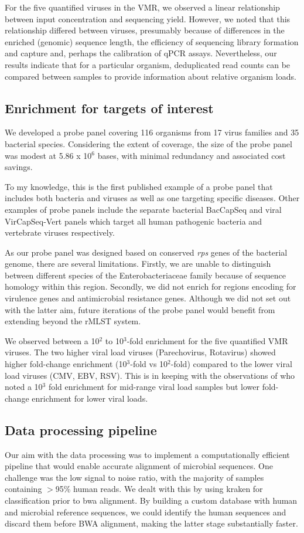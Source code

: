 For the five quantified viruses in the VMR, we observed a linear relationship between input concentration and sequencing yield. However, we noted that this relationship differed between viruses, presumably because of differences in the enriched (genomic) sequence length, the efficiency of sequencing library formation and capture and, perhaps the calibration of qPCR assays. Nevertheless, our results indicate that for a particular organism, deduplicated read counts can be compared between samples to provide information about relative organism loads. 

\subsection{Enrichment for targets of interest}
We developed a probe panel covering 116 organisms from 17 virus families and 35 bacterial species. Considering the extent of coverage, the size of the probe panel was modest at 5.86 x 10$^6$ bases, with minimal redundancy and associated cost savings. 

To my knowledge, this is the first published example of a probe panel that includes both bacteria and viruses as well as one targeting specific diseases. Other examples of probe panels include the separate bacterial BacCapSeq \parencite{Allicock2018} and viral VirCapSeq-Vert \parencite{Briese2015} panels which target all human pathogenic bacteria and vertebrate viruses respectively. 

As our probe panel was designed based on conserved \textit{rps} genes of the bacterial genome, there are several limitations. Firstly, we are unable to distinguish between different species of the Enterobacteriaceae family because of sequence homology within this region. Secondly, we did not enrich for regions encoding for virulence genes and antimicrobial resistance genes. Although we did not set out with the latter aim, future iterations of the probe panel would benefit from extending beyond the rMLST system.

We observed between a 10$^2$ to 10$^3$-fold enrichment for the five quantified VMR viruses. The two higher viral load viruses (Parechovirus, Rotavirus) showed higher fold-change enrichment (10$^3$-fold vs 10$^2$-fold) compared to the lower viral load viruses (CMV, EBV, RSV). This is in keeping with the observations of \parencite{Bonsall2015} who noted a 10$^3$ fold enrichment for mid-range viral load samples but lower fold-change enrichment for lower viral loads. 

\subsection{Data processing pipeline}
Our aim with the data processing was to implement a computationally efficient pipeline that would enable accurate alignment of microbial sequences. One challenge was the low signal to noise ratio, with the majority of samples containing $>$95\% human reads. We dealt with this by using kraken for classification prior to bwa alignment. By building a custom database with human and microbial reference sequences, we could identify the human sequences and discard them before BWA alignment, making the latter stage substantially faster.

